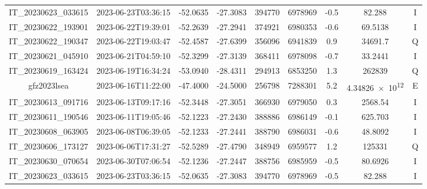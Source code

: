 \begin{center}
\begin{longtable}{ccccS[table-format=6.0]S[table-format=7.0]ccc}
\begin{adjustbox}{width=\textwidth}
    IT\_20230623\_033615 & 2023-06-23T03:36:15 & -52.0635 & -27.3083 & 394770 & 6978969 & -0.5 & \num[round-precision=3,round-mode=figures,scientific-notation=true]{82.288} & I \\
    IT\_20230622\_193901 & 2023-06-22T19:39:01 & -52.2639 & -27.2941 & 374921 & 6980353 & -0.6 & \num[round-precision=3,round-mode=figures,scientific-notation=true]{69.5138} & I \\
    IT\_20230622\_190347 & 2023-06-22T19:03:47 & -52.4587 & -27.6399 & 356096 & 6941839 & 0.9 & \num[round-precision=3,round-mode=figures,scientific-notation=true]{34691.7} & Q \\
    IT\_20230621\_045910 & 2023-06-21T04:59:10 & -52.3299 & -27.3139 & 368411 & 6978098 & -0.7 & \num[round-precision=3,round-mode=figures,scientific-notation=true]{33.2441} & I \\
    IT\_20230619\_163424 & 2023-06-19T16:34:24 & -53.0940 & -28.4311 & 294913 & 6853250 & 1.3 & \num[round-precision=3,round-mode=figures,scientific-notation=true]{262839} & Q \\
    gfz2023lsea & 2023-06-16T11:22:00 & -47.4000 & -24.5000 & 256798 & 7288301 & 5.2 & \num[round-precision=3,round-mode=figures,scientific-notation=true]{4.34826e+12} & E \\
    IT\_20230613\_091716 & 2023-06-13T09:17:16 & -52.3448 & -27.3051 & 366930 & 6979050 & 0.3 & \num[round-precision=3,round-mode=figures,scientific-notation=true]{2568.54} & I \\
    IT\_20230611\_190546 & 2023-06-11T19:05:46 & -52.1223 & -27.2430 & 388886 & 6986149 & -0.1 & \num[round-precision=3,round-mode=figures,scientific-notation=true]{625.703} & I \\
    IT\_20230608\_063905 & 2023-06-08T06:39:05 & -52.1233 & -27.2441 & 388790 & 6986031 & -0.6 & \num[round-precision=3,round-mode=figures,scientific-notation=true]{48.8092} & I \\
    IT\_20230606\_173127 & 2023-06-06T17:31:27 & -52.5289 & -27.4790 & 348949 & 6959577 & 1.2 & \num[round-precision=3,round-mode=figures,scientific-notation=true]{125331} & Q \\               IT\_20230630\_070654 & 2023-06-30T07:06:54 & -52.1236 & -27.2447 & 388756 & 6985959 & -0.5 & \num[round-precision=3,round-mode=figures,scientific-notation=true]{80.6926} & I \\
    IT\_20230623\_033615 & 2023-06-23T03:36:15 & -52.0635 & -27.3083 & 394770 & 6978969 & -0.5 & \num[round-precision=3,round-mode=figures,scientific-notation=true]{82.288} & I \\

\end{adjustbox}
\end{longtable}
\end{center}
